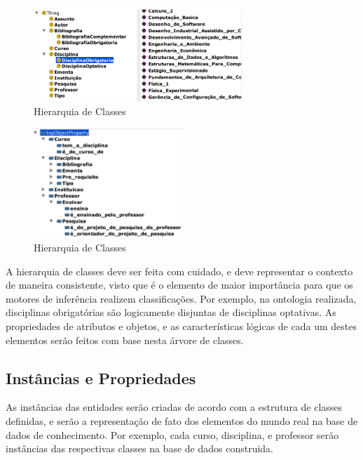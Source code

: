 \begin{figure}[H]
	\centering
	\includegraphics[width=0.7\textwidth]{imagens/hierarquia2}
	\caption{Hierarquia de Classes}
	\label{img:hierarquia2}
\end{figure}

\begin{figure}[H]
	\centering
	\includegraphics[width=0.5\textwidth]{imagens/hierarquia3}
	\caption{Hierarquia de Classes}
	\label{img:hierarquia3}
\end{figure}

 A hierarquia de classes deve ser feita com cuidado, e deve representar o contexto de maneira consistente, visto que é o elemento de maior importância para que os motores de inferência realizem classificações. Por exemplo, na ontologia realizada, disciplinas obrigatórias são logicamente disjuntas de disciplinas optativas. As propriedades de atributos e objetos, e as características lógicas de cada um destes elementos serão feitos com base nesta árvore de classes.


\subsection{Instâncias e Propriedades} %
\label{sub:inst_ncias_e_propriedades}

As instâncias das entidades serão criadas de acordo com a estrutura de classes definidas, e serão a representação de fato dos elementos do mundo real na base de dados de conhecimento. Por exemplo, cada curso, disciplina, e professor serão instâncias das respectivas classes na base de dados construida.

